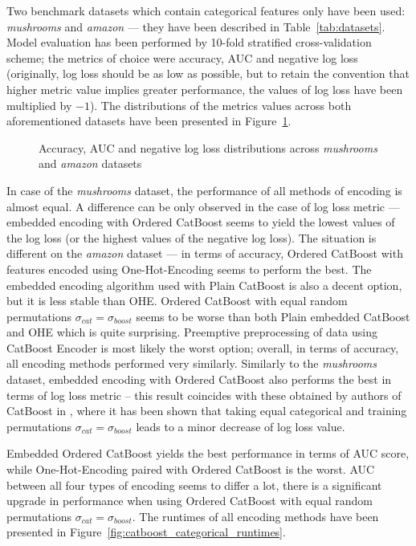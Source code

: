 \documentclass[magisterska, english]{pwr_wmat_praca_dyplomowa}
\theoremstyle{plain}
\numberwithin{theorem}{chapter}
\theoremstyle{definition}
\numberwithin{theorem}{chapter}
\begin{document}
Two benchmark datasets which contain categorical features only have been used: \emph{mushrooms} and \emph{amazon} --- they have been described in Table~\ref{tab:datasets}. Model evaluation has been performed by 10-fold stratified cross-validation scheme; the metrics of choice were accuracy, AUC and negative log loss (originally, log loss should be as low as possible, but to retain the convention that higher metric value implies greater performance, the values of log loss have been multiplied by $-1$). The distributions of the metrics values across both aforementioned datasets have been presented in Figure~\ref{fig:catboost_categorical_results}.

\begin{figure}[H]
	\centering
	\caption{Accuracy, AUC and negative log loss distributions across \emph{mushrooms} and \emph{amazon} datasets}
	\label{fig:catboost_categorical_results}
\end{figure}

In case of the \emph{mushrooms} dataset, the performance of all methods of encoding is almost equal. A difference can be only observed in the case of log loss metric --- embedded encoding with Ordered CatBoost seems to yield the lowest values of the log loss (or the highest values of the negative log loss). The situation is different on the \emph{amazon} dataset --- in terms of accuracy, Ordered CatBoost with features encoded using One-Hot-Encoding seems to perform the best. The embedded encoding algorithm used with Plain CatBoost is also a decent option, but it is less stable than OHE. Ordered CatBoost with equal random permutations $\sigma_{cat} = \sigma_{boost}$ seems to be worse than both Plain embedded CatBoost and OHE which is quite surprising. Preemptive preprocessing of data using CatBoost Encoder is most likely the worst option; overall, in terms of accuracy, all encoding methods performed very similarly. Similarly to the \emph{mushrooms} dataset, embedded encoding with Ordered CatBoost also performs the best in terms of log loss metric -- this result coincides with these obtained by authors of CatBoost in \cite{catboost}, where it has been shown that taking equal categorical and training permutations $\sigma_{cat} = \sigma_{boost}$ leads to a minor decrease of log loss value.

Embedded Ordered CatBoost yields the best performance in terms of AUC score, while One-Hot-Encoding paired with Ordered CatBoost is the worst. AUC between all four types of encoding seems to differ a lot, there is a significant upgrade in performance when using Ordered CatBoost with equal random permutations $\sigma_{cat} = \sigma_{boost}$. The runtimes of all encoding methods have been presented in Figure~\ref{fig:catboost_categorical_runtimes}.
\end{document}
